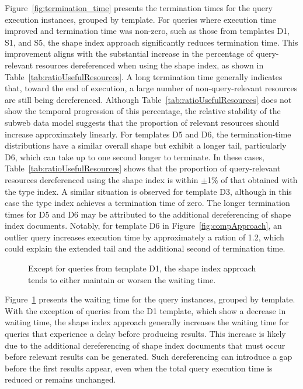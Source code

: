 Figure~\ref{fig:termination_time} presents the termination times for the query execution instances, grouped by template. 
For queries where execution time improved and termination time was non-zero, such as those from templates D1, S1, and S5, the shape index approach significantly reduces termination time. 
This improvement aligns with the substantial increase in the percentage of query-relevant resources dereferenced when using the shape index, as shown in Table~\ref{tab:ratioUsefulResources}.
A long termination time generally indicates that, toward the end of execution, a large number of non-query-relevant resources are still being dereferenced. 
Although Table~\ref{tab:ratioUsefulResources} does not show the temporal progression of this percentage, the relative stability of the subweb data model suggests that the proportion of relevant resources should increase approximately linearly.
For templates D5 and D6, the termination-time distributions have a similar overall shape but exhibit a longer tail, particularly D6, which can take up to one second longer to terminate. 
In these cases, Table~\ref{tab:ratioUsefulResources} shows that the proportion of query-relevant resources dereferenced using the shape index is within $\pm$1\% of that obtained with the type index. 
A similar situation is observed for template D3, although in this case the type index achieves a termination time of zero. 
The longer termination times for D5 and D6 may be attributed to the additional dereferencing of shape index documents. 
Notably, for template D6 in Figure~\ref{fig:compApproach}, an outlier query increases execution time by approximately a ration of 1.2, which could explain the extended tail and the additional second of termination time.


\begin{figure}
    \centering
    
    \caption{Except for queries from template D1, the shape index approach tends to either maintain or worsen the waiting time.}
    \label{fig:waiting_time}
\end{figure}

Figure~\ref{fig:waiting_time} presents the waiting time for the query instances, grouped by template. 
With the exception of queries from the D1 template, which show a decrease in waiting time, the shape index approach generally increases the waiting time for queries that experience a delay before producing results. 
This increase is likely due to the additional dereferencing of shape index documents that must occur before relevant results can be generated. 
Such dereferencing can introduce a gap before the first results appear, even when the total query execution time is reduced or remains unchanged.

